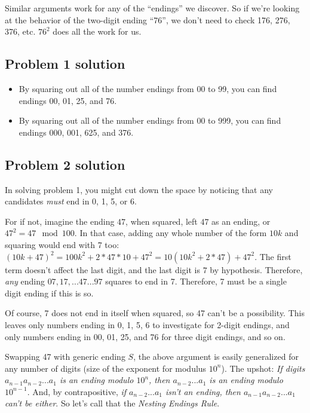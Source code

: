 \documentclass[11pt, oneside]{article} 	%
\begin{document}
Similar arguments work for any of the ``endings'' we discover.  So if we're looking at the behavior of the two-digit ending ``76'', we don't need to check 176, 276, 376, etc.  $76^2$ does all the work for us.

\subsection{Problem 1 solution}

\begin{itemize} 
\item By squaring out all of the number endings from 00 to 99, you can find  endings 00, 01, 25, and 76.
\item By squaring out all of the number endings from 00 to 999, you can find  endings 000, 001, 625, and 376.
\end{itemize} 

\subsection{Problem 2 solution} 

In solving problem 1, you might cut down the space by noticing that any candidates \emph{must} end in 0, 1, 5, or 6.  

For if not, imagine the ending $47$, when squared, left $47$ as an ending, or $47^2 = 47 \mod 100$.  In that case, adding any whole number of the form $10k$ and squaring would end with 7 too: $(10k+47)^2 = 100k^2 + 2*47*10 + 47^2 = 10(10k^2 + 2*47) + 47^2$.  The first term doesn't affect the last digit, and the last digit is $7$ by hypothesis.  Therefore, \emph{any} ending $07, 17, ... 47 ... 97$ squares to end in 7.  Therefore, 7 must be a single digit ending if this is so.

Of course, 7 does not end in itself when squared, so 47 can't be a possibility.  This leaves only numbers ending in 0, 1, 5, 6 to investigate for 2-digit endings, and only numbers ending in 00, 01, 25, and 76 for three digit endings, and so on.

Swapping 47 with generic ending $S$, the above argument is easily generalized for any number of digits (size of the exponent for modulus $10^n$).  The upshot: \emph{If digits $a_{n-1}a_{n-2}...a_1$ is an ending modulo $10^n$, then $a_{n-2}...a_1$ is an ending modulo $10^{n-1}$}.  And, by contrapositive, \emph{if $a_{n-2}...a_1$ isn't an ending, then $a_{n-1}a_{n-2}...a_1$ can't be either}.  So let's call that the \emph{Nesting Endings Rule}.
\end{document}
